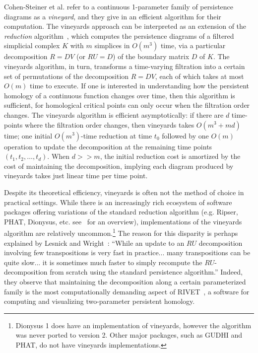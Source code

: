 \documentclass[sn-mathphys]{sn-jnl}
\begin{document}
Cohen-Steiner et al. refer to a continuous 1-parameter family of persistence diagrams as a \emph{vineyard}, and they give in \cite{cohen2006vines} an efficient algorithm for their computation. 
The vineyards approach can be interpreted as an extension of the \emph{reduction} algorithm~\cite{zomorodian2005computing}, which computes the persistence diagrams of a filtered simplicial complex $K$ with $m$ simplices in $O(m^3)$ time, via a particular decomposition $R = D V$ (or $RU = D$) of the boundary matrix $D$ of $K$.
The vineyards algorithm, in turn,  transforms a time-varying filtration into a certain set of permutations of the decomposition $R = DV$, each of which takes at most $O(m)$ time to execute. If one is interested in understanding how the persistent homology of a continuous function changes over time, then this algorithm is sufficient, for homological critical points can only occur when the filtration order changes. 
The vineyards algorithm is efficient asymptotically: if there are $d$ time-points where the filtration order changes, then  vineyards   takes $O(m^3 + md)$ time; one initial $O(m^3)$-time reduction at time $t_0$ followed by one $O(m)$ operation to update the decomposition at the remaining time points $(t_1, t_2, \dots, t_d)$. When $d >> m$, the initial reduction cost is amortized by the cost of maintaining the decomposition, implying each diagram produced by vineyards takes just linear time per time point. 

Despite its theoretical efficiency, vineyards is often not the method of choice in practical settings. 
While there is an increasingly rich ecosystem of software packages offering variations of the standard reduction algorithm (e.g. Ripser, PHAT, Dionysus, etc. see~\cite{otter2017roadmap} for an overview), implementations of the vineyards algorithm are relatively uncommon.\footnote{Dionysus 1 does have an implementation of vineyards, however the algorithm was never ported to version 2. Other major packages, such as GUDHI and PHAT, do not have vineyards implementations.} 
The reason for this disparity is perhaps explained by Lesnick and Wright~\cite{lesnick2015interactive}: ``While an update to an $RU$ decomposition involving few transpositions is very fast in practice... many transpositions can be quite slow... it is sometimes much faster to simply recompute the $RU$-decomposition from scratch using the standard persistence algorithm.'' Indeed, they observe that maintaining the decomposition along a certain parameterized family is the most computationally demanding aspect of RIVET~\cite{rivet}, a software for computing and visualizing	 two-parameter persistent homology.
\end{document}
